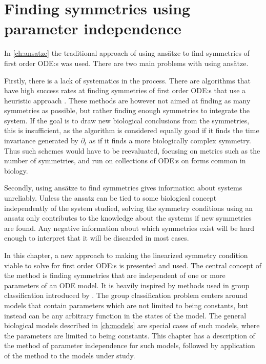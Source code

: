 \chapter{Finding symmetries using parameter independence}\label{ch:param-ind}

In \cref{ch:ansatze} the traditional approach of using ansätze to find symmetries of first order ODE:s was used.
There are two main problems with using ansätze.

Firstly, there is a lack of systematics in the process.
There are algorithms that have high success rates at finding symmetries of first order ODE:s that use a heuristic approach \cite{chebterrab1997computer,chebterrab1998patterns}.
These methods are however not aimed at finding as many symmetries as possible, but rather finding enough symmetries to integrate the system.
If the goal is to draw new biological conclusions from the symmetries, this is insufficient, as the algorithm is considered equally good if it finds the time invariance generated by \(\partial_t\) as if it finds a more biologically complex symmetry.
Thus such schemes would have to be reevaluated, focusing on metrics such as the number of symmetries, and run on collections of ODE:s on forms common in biology.

Secondly, using ansätze to find symmetries gives information about systems unreliably.
Unless the ansatz can be tied to some biological concept independently of the system studied, solving the symmetry conditions using an ansatz only contributes to the knowledge about the systems if new symmetries are found.
Any negative information about which symmetries exist will be hard enough to interpret that it will be discarded in most cases.

In this chapter, a new approach to making the linearized symmetry condition viable to solve for first order ODE:s is presented and used.
The central concept of the method is finding symmetries that are independent of one or more parameters of an ODE model.
It is heavily inspired by methods used in group classification introduced by \citeauthor{ovsiannikov1982group} \cite{ovsiannikov1982group}.
The group classification problem centers around models that contain parameters which are not limited to being constants, but instead can be any arbitrary function in the states of the model.
The general biological models described in \cref{ch:models} are special cases of such models, where the parameters are limited to being constants.
This chapter has a description of the method of parameter independence for such models, followed by application of the method to the models under study.

